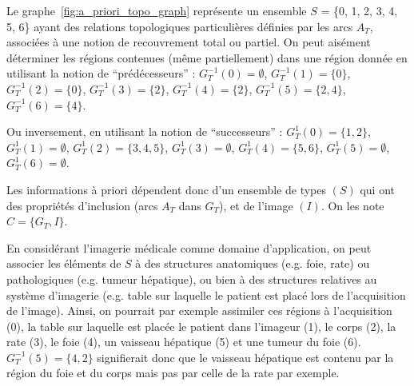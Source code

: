	Le graphe~\ref{fig:a_priori_topo_graph} représente un ensemble $S$ = \{0, 1, 2, 3, 4, 5, 6\} ayant des relations topologiques particulières définies par les arcs $A_T$, associées à une notion de recouvrement total ou partiel. On peut aisément déterminer les régions contenues (même partiellement) dans une région donnée en utilisant la notion de ``prédécesseurs'' : $G_T^{-1}(0)=\emptyset$, $G_T^{-1}(1) = \{0\}$, $G_T^{-1}(2) = \{0\}$, $G_T^{-1}(3) = \{2\}$, $G_T^{-1}(4) = \{2\}$, $G_T^{-1}(5) = \{2,4\}$, $G_T^{-1}(6) = \{4\}$. 

	Ou inversement, en utilisant la notion de ``successeurs'' : $G_T^{1}(0)=\{1,2\}$, $G_T^{1}(1) = \emptyset$, $G_T^{1}(2)=\{3,4,5\}$, $G_T^{1}(3)=\emptyset$, $G_T^{1}(4)=\{5,6\}$, $G_T^{1}(5)=\emptyset$, $G_T^{1}(6)=\emptyset$.

	Les informations à priori dépendent donc d'un ensemble de types $(S)$ qui ont des propriétés d'inclusion (arcs $A_T$ dans $G_T$), et de l'image $(I)$. On les note $C=\{G_T, I\}$.\vspace{1em}

	En considérant l'imagerie médicale comme domaine d'application, on peut associer les éléments de $S$ à des structures anatomiques (e.g. foie, rate) ou pathologiques (e.g. tumeur hépatique), ou bien à des structures relatives au système d'imagerie (e.g. table sur laquelle le patient est placé lors de l'acquisition de l'image). Ainsi, on pourrait par exemple assimiler ces régions à l'acquisition (0), la table sur laquelle est placée le patient dans l'imageur (1), le corps (2), la rate (3), le foie (4), un vaisseau hépatique (5) et une tumeur du foie (6). $G_T^{-1}(5)=\{4,2\}$ signifierait donc que le vaisseau hépatique est contenu par la région du foie et du corps mais pas par celle de la rate par exemple. 




